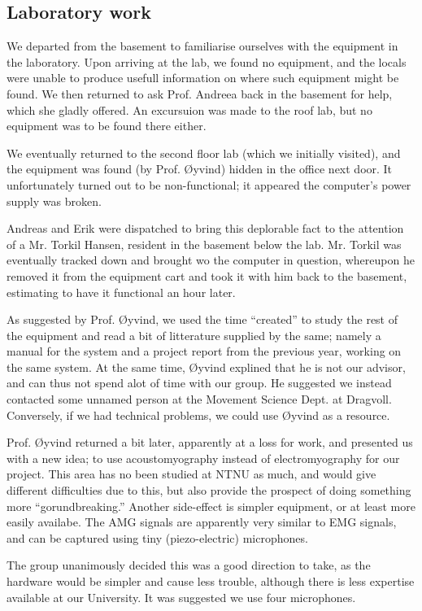 \documentclass[a4paper, oneside, fleqn, halfparskip]{scrartcl}
\begin{document}
\subsection{Laboratory work}
We departed from the basement to familiarise ourselves with the equipment in the laboratory. Upon arriving at the lab, we found no equipment, and the locals were unable to produce usefull information on where such equipment might be found. We then returned to ask Prof. Andreea back in the basement for help, which she gladly offered. An excursuion was made to the roof lab, but no equipment was to be found there either.

We eventually returned to the second floor lab (which we initially visited), and the equipment was found (by Prof. Øyvind) hidden in the office next door. It unfortunately turned out to be non-functional; it appeared the computer's power supply was broken.

Andreas and Erik were dispatched to bring this deplorable fact to the attention of a Mr. Torkil Hansen, resident in the basement below the lab. Mr. Torkil was eventually tracked down and brought wo the computer in question, whereupon he removed it from the equipment cart and took it with him back to the basement, estimating to have it functional an hour later.

As suggested by Prof. Øyvind, we used the time ``created'' to study the rest of the equipment and read a bit of litterature supplied by the same; namely a manual for the system and a project report from the previous year, working on the same system. At the same time, Øyvind explined that he is not our advisor, and can thus not spend alot of time with our group. He suggested we instead contacted some unnamed person at the Movement Science Dept. at Dragvoll. Conversely, if we had technical problems, we could use Øyvind as a resource.

Prof. Øyvind returned a bit later, apparently at a loss for work, and presented us with a new idea; to use acoustomyography instead of electromyography for our project. This area has no been studied at NTNU as much, and would give different difficulties due to this, but also provide the prospect of doing something more ``gorundbreaking.'' Another side-effect is simpler equipment, or at least more easily availabe. The AMG signals are apparently very similar to EMG signals, and can be captured using tiny (piezo-electric) microphones.

The group unanimously decided this was a good direction to take, as the hardware would be simpler and cause less trouble, although there is less expertise available at our University. It was suggested we use four microphones.
\end{document}
